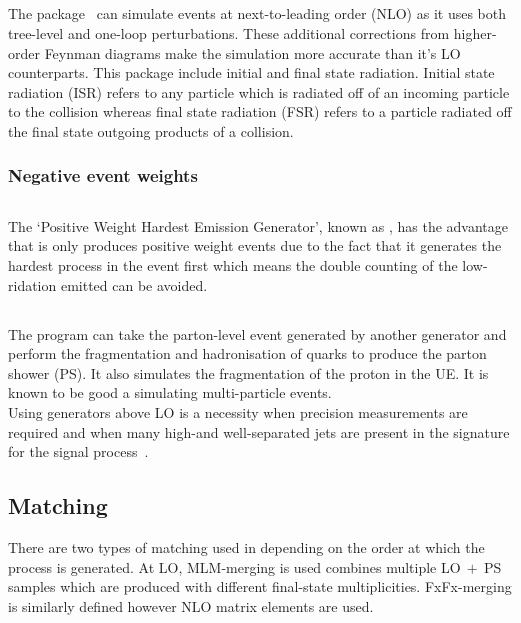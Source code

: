 \subsection{\aMCATNLO}
The \aMCATNLO package~\cite{Degrande:2014sta} can simulate events at next-to-leading order (NLO) as it uses both tree-level and one-loop perturbations. These additional corrections from higher-order Feynman diagrams make the simulation more accurate than it's LO counterparts. This package include initial and final state radiation. Initial state radiation (ISR) refers to any particle which is radiated off of an incoming particle to the collision whereas final state radiation (FSR) refers to a particle radiated off the final state outgoing products of a collision.\\
\subsubsection{Negative event weights}



\subsection{\POWHEG}
The `Positive Weight Hardest Emission Generator', known as \POWHEG, has the advantage that is only produces positive weight events due to the fact that it generates the hardest process in the event first which means the double counting of the low-\pt ridation emitted can be avoided.  
\subsection{\PYTHIA}
The \PYTHIA program can take the parton-level event generated by another generator and perform the fragmentation and hadronisation of quarks to produce the parton shower (PS). It also simulates the fragmentation of the proton in the UE. It is known to be good a simulating multi-particle events.\\

Using generators above LO is a necessity when precision measurements are required and when many high-\pt and well-separated jets are present in the signature for the signal process~\cite{Degrande:2014sta}. 

\subsection{Matching}
There are two types of matching used in \MADGRAPH depending on the order at which the process is generated. At LO, MLM-merging is used combines multiple LO$~+~$PS samples which are produced with different final-state multiplicities. FxFx-merging is similarly defined however NLO matrix elements are used.



